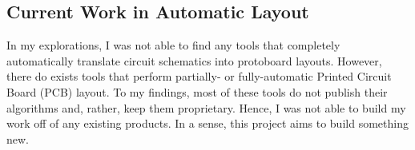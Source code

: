 \subsection{Current Work in Automatic Layout}

In my explorations, I was not able to find any tools that completely
automatically translate circuit schematics into protoboard layouts.
However, there
do exists tools that perform partially- or fully-automatic Printed Circuit
Board (PCB) layout. To my findings, most of these tools do not publish their
algorithms and, rather, keep them proprietary. Hence, I was not able to build my
work off of any existing products. In a sense, this project aims to build
something new.
